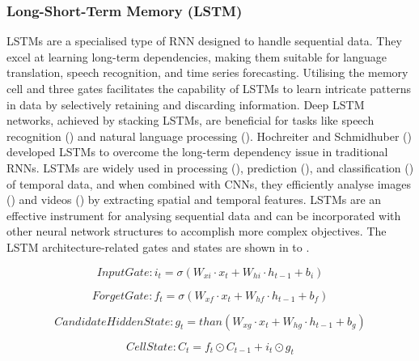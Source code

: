 \documentclass[a4paper, fleqn]{cas-sc}
\theoremstyle{definition}
\theoremstyle{remark}
\begin{document}
\subsubsection{Long-Short-Term Memory (LSTM)}
LSTMs are a specialised type of RNN designed to handle sequential data. They excel at learning long-term dependencies,  making them suitable for language translation,  speech recognition,  and time series forecasting. Utilising the memory cell and three gates facilitates the capability of LSTMs to learn intricate patterns in data by selectively retaining and discarding information. Deep LSTM networks,  achieved by stacking LSTMs,  are beneficial for tasks like speech recognition (\cite{soltau2016neural, jo2020approximate}) and natural language processing (\cite{wang2015learning, nammous2019natural}). Hochreiter and Schmidhuber  (\cite{hochreiter1997long}) developed LSTMs to overcome the long-term dependency issue in traditional RNNs. LSTMs are widely used in processing (\cite{sahin2018nonuniformly}),  prediction (\cite{gers2000learning}),  and classification (\cite{zhou2015c, karim2017lstm}) of temporal data,  and when combined with CNNs,  they efficiently analyse images (\cite{li2019cnn, rajendran2020land, islam2020combined}) and videos (\cite{ullah2017action, li2020classifying, gao2017video, bin2018describing}) by extracting spatial and temporal features. LSTMs are an effective instrument for analysing sequential data and can be incorporated with other neural network structures to accomplish more complex objectives.
The LSTM architecture-related gates and states are shown in  to .

  \begin{equation} \label{lstm i}
    Input Gate :  i_t=\sigma (W_{xi}\cdot x_t+W_{hi}\cdot h_{t-1}+b_i)
  \end{equation}
 
  \begin{equation}\label{lstm f}
    Forget Gate :  f_t= \sigma(W_{xf}\cdot x_t +W_{hf}\cdot h_{t-1}+b_f)
  \end{equation}

  \begin{equation}\label{lstm c}
    Candidate Hidden State :   g_t=than(W_{xg}\cdot x_t+W_{hg}\cdot h_{t-1} +b_g)
  \end{equation}

  \begin{equation}\label{lstm ce}
    Cell State :  C_t=f_t \odot C_{t-1}+i_t \odot g_t
  \end{equation}
\end{document}
